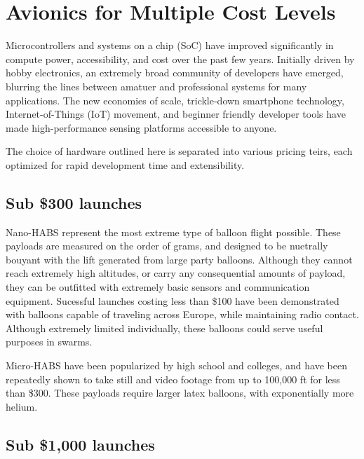 \documentclass[heading.tex]{subfiles}
\begin{document}
\section{Avionics for Multiple Cost Levels}

Microcontrollers and systems on a chip (SoC) have improved significantly in 
compute power, accessibility, and cost over the past few years.
Initially driven by hobby electronics, an extremely broad community of developers
have emerged, blurring the lines between amatuer and professional systems for
many applications. The new economies of scale, trickle-down smartphone
technology, Internet-of-Things (IoT) movement, and beginner friendly developer
tools have made high-performance sensing platforms accessible to anyone.

The choice of hardware outlined here is separated into various pricing teirs,
each optimized for rapid development time and extensibility.
\subsection{Sub \$300 launches}

Nano-HABS represent the most extreme type of balloon flight possible.
These payloads are measured on the order of grams, and designed to be nuetrally
bouyant with the lift generated from large party balloons. Although they cannot
reach extremely high altitudes, or carry any consequential amounts of payload,
they can be outfitted with extremely basic sensors and communication equipment.
Sucessful launches costing less than \$100 have been demonstrated with balloons
capable of traveling across Europe, while maintaining radio contact. Although
extremely limited individually, these balloons could serve useful purposes in
swarms.

Micro-HABS have been popularized by high school and colleges, and have been
repeatedly shown to take still and video footage from up to 100,000 ft for less
than \$300. These payloads require larger latex balloons, with exponentially
more helium.

\subsection{Sub \$1,000 launches}
\end{document}
